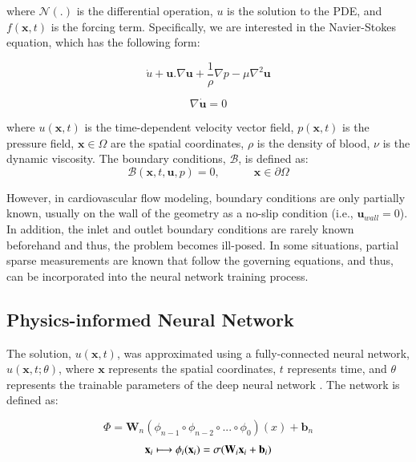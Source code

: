 \documentclass[times,twocolumn,final]{elsarticle}
\begin{document}
{where $\mathcal{N(.)}$ is the differential operation, $u$ is the solution to the PDE, and $f(\textbf{x},t)$ is the forcing term. Specifically, we are interested in the Navier-Stokes equation, which has the following form:

\begin{equation}
\dot{u} +  \textbf{u}.\nabla \textbf{u} + \frac{1}{\rho} \nabla p - \mu \nabla^{2} \textbf{u}
\end{equation}

\begin{equation}
\nabla \dot {\textbf{u}} = 0
\end{equation}

where $u(\textbf{x},t)$ is the time-dependent velocity vector field, $p(\textbf{x},t)$ is the pressure field, $\textbf{x} \in \Omega$ are the spatial coordinates, $\rho$ is the density of blood, $\nu$ is the dynamic viscosity. The boundary conditions, $\mathcal{B}$, is defined as:
\begin{equation}
\mathcal{B}(\textbf{x},t,\textbf{u},p)=0, \quad \quad \quad \textbf{x} \in \partial \Omega
\end{equation}

However, in cardiovascular flow modeling, boundary conditions are only partially known, usually on the wall of the geometry as a no-slip condition (i.e., $\textbf{u}_{wall}=0$). In addition, the inlet and outlet boundary conditions are rarely known beforehand and thus, the problem becomes ill-posed. In some situations, partial sparse measurements are known that follow the governing equations, and thus, can be incorporated into the neural network training process. 

\subsection{Physics-informed Neural Network}
The solution, $u(\textbf{x},t)$, was approximated using a fully-connected neural network, $u(\textbf{x},t;\theta)$, where $\textbf{x}$ represents the spatial coordinates, $t$ represents time, and $\theta$ represents the trainable parameters of the deep neural network \citep{Jin2021_PINNs}. The network is defined as:

\begin{equation}
\Phi = \textbf{W}_{n}(\phi_{n-1} \circ \phi_{n-2} \circ ... \circ \phi_{0})(x)+\textbf{b}_n
\end{equation}
\begin{equation}
\textbf{x}_{i} \longmapsto \phi_{i}(\textbf{x}_{i})=\sigma(\textbf{W}_{i}\textbf{x}_{i}+\textbf{b}_i)\\
\end{equation}

}
\end{document}

